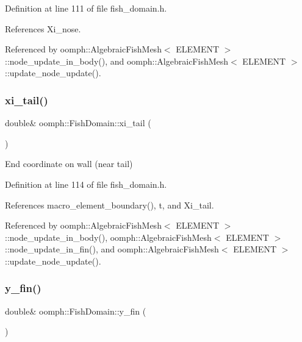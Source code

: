 Definition at line 111 of file fish\+\_\+domain.\+h.



References Xi\+\_\+nose.



Referenced by oomph\+::\+Algebraic\+Fish\+Mesh$<$ E\+L\+E\+M\+E\+N\+T $>$\+::node\+\_\+update\+\_\+in\+\_\+body(), and oomph\+::\+Algebraic\+Fish\+Mesh$<$ E\+L\+E\+M\+E\+N\+T $>$\+::update\+\_\+node\+\_\+update().

\mbox{\label{classoomph_1_1FishDomain_ae2bcc0014506ba2225b928f319a27c9d}} 
\subsubsection{\texorpdfstring{xi\+\_\+tail()}{xi\_tail()}}
{\footnotesize\ttfamily double\& oomph\+::\+Fish\+Domain\+::xi\+\_\+tail (\begin{DoxyParamCaption}{ }\end{DoxyParamCaption})\hspace{0.3cm}{\ttfamily [inline]}}



End coordinate on wall (near tail) 



Definition at line 114 of file fish\+\_\+domain.\+h.



References macro\+\_\+element\+\_\+boundary(), t, and Xi\+\_\+tail.



Referenced by oomph\+::\+Algebraic\+Fish\+Mesh$<$ E\+L\+E\+M\+E\+N\+T $>$\+::node\+\_\+update\+\_\+in\+\_\+body(), oomph\+::\+Algebraic\+Fish\+Mesh$<$ E\+L\+E\+M\+E\+N\+T $>$\+::node\+\_\+update\+\_\+in\+\_\+fin(), and oomph\+::\+Algebraic\+Fish\+Mesh$<$ E\+L\+E\+M\+E\+N\+T $>$\+::update\+\_\+node\+\_\+update().

\mbox{\label{classoomph_1_1FishDomain_ae1a869cee7946b178a09214725e27f29}} 
\subsubsection{\texorpdfstring{y\+\_\+fin()}{y\_fin()}}
{\footnotesize\ttfamily double\& oomph\+::\+Fish\+Domain\+::y\+\_\+fin (\begin{DoxyParamCaption}{ }\end{DoxyParamCaption})\hspace{0.3cm}{\ttfamily [inline]}}



